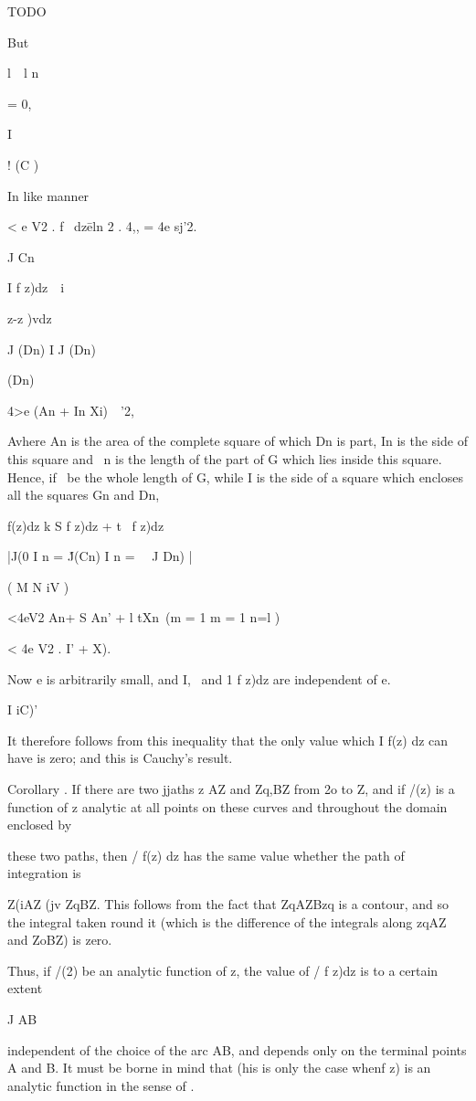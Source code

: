 TODO

But

l\ \ l n

= 0,

I

! (C )

In like manner

< e V2 . f \ dz\= eln \/2 . 4,, = 4e sj'2.

J Cn

I f z)dz\ \ i \ \ {z-z )vdz\

J (Dn) I J (Dn)

(Dn)

  4>e (An + In Xi)\ \ '2,

Avhere An is the area of the complete square of which Dn is part, In
is the side of this square and \ n is the length of the part of G
which lies inside this square. Hence, if \ be the whole length of G,
while I is the side of a square which encloses all the squares Gn and
Dn,

f(z)dz k S f z)dz + t \ f z)dz

|J(0 I n = \'J(Cn) I n = \ \ J Dn) |

( M N iV )

<4eV2 An+ S An' + l tXn\ (m = 1 m = 1 n=l )

< 4e V2 . I' + X).

Now e is arbitrarily small, and I, \ and 1 f z)dz are independent of
e.

I iC)'

It therefore follows from this inequality that the only value which I
f(z) dz can have is zero; and this is Cauchy's result.

%
%

Corollary . If there are two jjaths z AZ and Zq,BZ from 2o to Z, and
if /(z) is a function of z analytic at all points on these curves and
throughout the domain enclosed by

these two paths, then / f(z) dz has the same value whether the path of
integration is

Z(iAZ (jv ZqBZ. This follows from the fact that ZqAZBzq is a contour,
and so the integral taken round it (which is the difference of the
integrals along zqAZ and ZoBZ) is zero.

Thus, if /(2) be an analytic function of z, the value of / f z)dz is
to a certain extent

J AB

independent of the choice of the arc AB, and depends only on the
terminal points A and B. It must be borne in mind that (his is only
the case whenf z) is an analytic function in the sense of .

}
